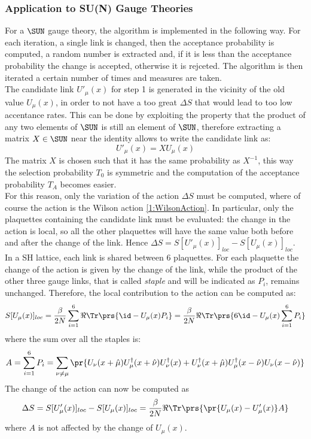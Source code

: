 \subsubsection{Application to SU(N) Gauge Theories}
For a $\SUN$ gauge theory, the algorithm is implemented in the following way.
For each iteration, a single link is changed, then the acceptance probability is computed, a random number is extracted and, if it is less than the acceptance probability the change is accepted, otherwise it is rejceted. The algorithm is then iterated a certain number of times and measures are taken.\\
The candidate link $U'_\mu(x)$ for step 1 is generated in the vicinity of the old value $U_\mu(x)$, in order to not have a too great $\Delta S$ that would lead to too low accentance rates.
This can be done by exploiting the property that the product of any two elements of $\SUN$ is still an element of $\SUN$, therefore extracting a matrix $X\in\SUN$ near the identity allows to write the candidate link as:
\begin{equation}
    U'_\mu(x) = XU_\mu(x) \label{2:MetropolisCandidateLink}
\end{equation}
The matrix $X$ is chosen such that it has the same probability as $X^{-1}$, this way the selection probability $T_0$ is symmetric and the computation of the acceptance probability $T_A$ becomes easier.\\
For this reason, only the variation of the action $\Delta S$ must be computed, where of course the action is the Wilson action \eqref{1:WilsonAction}.
In particular, only the plaquettes containing the candidate link must be evaluated: the change in the action is local, so all the other plaquettes will have the same value both before and after the change of the link.
Hence $\Delta S = S[U'_\mu(x)]_{loc}-S[U_\mu(x)]_{loc}$.\\
In a SH lattice, each link is shared between $6$ plaquettes.
For each plaquette the change of the action is given by the change of the link, while the product of the other three gauge links, that is called \emph{staple} and will be indicated as $P_i$, remains unchanged.
Therefore, the local contribution to the action can be computed as:
\begin{equation*}
    S[U_\mu(x)]_{loc} = \frac\beta{2N} \sum_{i=1}^6 \Re\Tr\prs{\id-U_\mu(x)P_i} = \frac\beta{2N} \Re\Tr\prs{6\id-U_\mu(x)\sum_{i=1}^6P_i}
\end{equation*}
where the sum over all the staples is:
\begin{equation}
    A = \sum_{i=1}^6P_i = \sum_{\nu\neq\mu}\pr{U_\nu(x+\hat\mu)U^\dagger_\mu(x+\hat\nu)U^\dagger_\nu(x) + U^\dagger_\nu(x+\hat\mu)U^\dagger_\mu(x-\hat\nu)U_\nu(x-\hat\nu)} \label{2:SumOverStaples}
\end{equation}
The change of the action can now be computed as
\begin{equation}
    \Delta S = S[U'_\mu(x)]_{loc}-S[U_\mu(x)]_{loc} = \frac\beta{2N} \Re\Tr\prs{\pr{U_\mu(x)-U'_\mu(x)}A} \label{2:MetropolisActionVar}
\end{equation}
where $A$ is not affected by the change of $U_\mu(x)$.

